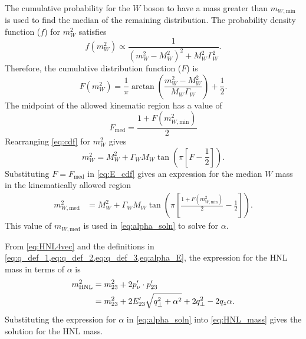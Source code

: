 The cumulative probability for the $W$ boson to have a mass greater than $m_{W,\mathrm{min}}$ is used to find the median of the remaining distribution.
The probability density function ($f$) for $m_W^2$ satisfies
%
\begin{equation*}
f(m_W^2) \propto \frac{1}{(m_W^2-M_W^2)^2 + M_W^2\Gamma_W^2}.
\end{equation*}
%
Therefore, the cumulative distribution function ($F$) is
\begin{equation}
F(m_W^2) = \frac{1}{\pi} \arctan\left( \frac{m_W^2-M_W^2}{M_W\Gamma_W}\right) + \frac{1}{2}. \label{eq:cdf}
\end{equation}
%
The midpoint of the allowed kinematic region has a value of
%
\begin{equation*}
F_{\mathrm{med}} = \frac{1+ F(m_{W,\mathrm{min}}^2)}{2}
\end{equation*}
%
Rearranging \cref{eq:cdf} for $m_W^2$ gives
%
\begin{equation}
m_W^2 = M_W^2 + \Gamma_W  M_W  \tan \left(\pi\left[F-\frac{1}{2}\right]\right). \label{eq:E_cdf}
\end{equation}
%
Substituting $F=F_{\mathrm{med}}$ in \cref{eq:E_cdf}
gives an expression for the median $W$ mass in the kinematically allowed region
%
\begin{align}
m_{W, \mathrm{med}}^2 &=  M_W^2 + \Gamma_W M_W \tan \left(\pi\left[\frac{1+ F(m_{W,\mathrm{min}}^2)}{2}-\frac{1}{2}\right]\right).  \nonumber  %
\end{align}
%
This value of $m_{W,\mathrm{med}}$ is used in \cref{eq:alpha_soln} to solve for $\alpha$.

From \cref{eq:HNL4vec} and the definitions in \cref{eq:q_def_1,eq:q_def_2,eq:q_def_3,eq:alpha_E}, the expression for the HNL mass in terms of $\alpha$ is
%
\begin{align}
m_{\mathrm{HNL}}^2 &= m_{23}^2 + 2p'_\nu \cdot p'_{23} \nonumber \\
&= m_{23}^2 + 2E'_{23}\sqrt{q_{\perp}^2+\alpha^2} + 2q_{\perp}^2 - 2q_z\alpha. \label{eq:HNL_mass}
\end{align}
%
Substituting the expression for $\alpha$ in \cref{eq:alpha_soln} into \cref{eq:HNL_mass} gives the solution for the HNL mass.